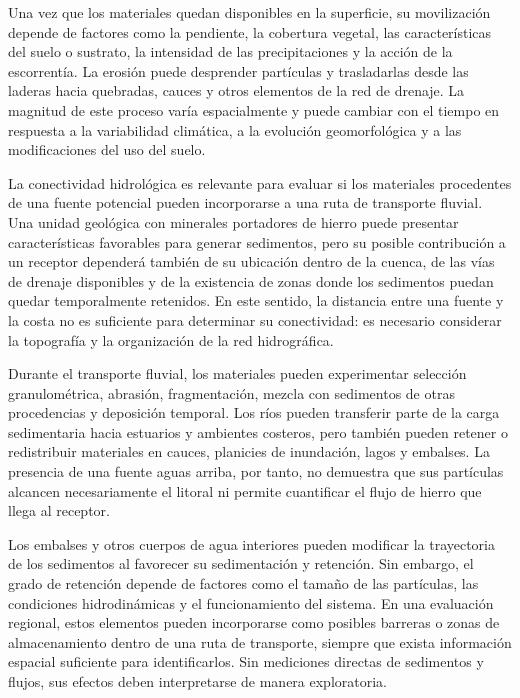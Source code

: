 Una vez que los materiales quedan disponibles en la superficie, su movilización depende de factores como la pendiente, la cobertura vegetal, las características del suelo o sustrato, la intensidad de las precipitaciones y la acción de la escorrentía. La erosión puede desprender partículas y trasladarlas desde las laderas hacia quebradas, cauces y otros elementos de la red de drenaje. La magnitud de este proceso varía espacialmente y puede cambiar con el tiempo en respuesta a la variabilidad climática, a la evolución geomorfológica y a las modificaciones del uso del suelo.

La conectividad hidrológica es relevante para evaluar si los materiales procedentes de una fuente potencial pueden incorporarse a una ruta de transporte fluvial. Una unidad geológica con minerales portadores de hierro puede presentar características favorables para generar sedimentos, pero su posible contribución a un receptor dependerá también de su ubicación dentro de la cuenca, de las vías de drenaje disponibles y de la existencia de zonas donde los sedimentos puedan quedar temporalmente retenidos. En este sentido, la distancia entre una fuente y la costa no es suficiente para determinar su conectividad: es necesario considerar la topografía y la organización de la red hidrográfica.

Durante el transporte fluvial, los materiales pueden experimentar selección granulométrica, abrasión, fragmentación, mezcla con sedimentos de otras procedencias y deposición temporal. Los ríos pueden transferir parte de la carga sedimentaria hacia estuarios y ambientes costeros, pero también pueden retener o redistribuir materiales en cauces, planicies de inundación, lagos y embalses. La presencia de una fuente aguas arriba, por tanto, no demuestra que sus partículas alcancen necesariamente el litoral ni permite cuantificar el flujo de hierro que llega al receptor.

Los embalses y otros cuerpos de agua interiores pueden modificar la trayectoria de los sedimentos al favorecer su sedimentación y retención. Sin embargo, el grado de retención depende de factores como el tamaño de las partículas, las condiciones hidrodinámicas y el funcionamiento del sistema. En una evaluación regional, estos elementos pueden incorporarse como posibles barreras o zonas de almacenamiento dentro de una ruta de transporte, siempre que exista información espacial suficiente para identificarlos. Sin mediciones directas de sedimentos y flujos, sus efectos deben interpretarse de manera exploratoria.

